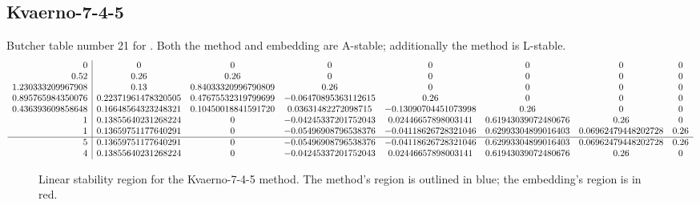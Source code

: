 \documentclass[letterpaper,10pt,english]{sphinxmanual}
\begin{document}
\subsection{Kvaerno-7-4-5}
\label{Butcher:kvaerno-7-4-5}\label{Butcher:butcher-kvaerno-7-4-5}
Butcher table number 21
for {\hyperref[c_interface/User_callable:c.ARKodeSetIRKTableNum]{\emph{}}}.  Both the
method and embedding are A-stable; additionally the method is
L-stable.
\begin{gather}
\begin{split}\begin{array}{r|ccccccc}
  0 & 0 & 0 & 0 & 0 & 0 & 0 & 0 \\
  0.52 & 0.26 & 0.26 & 0 & 0 & 0 & 0 & 0 \\
  1.230333209967908 & 0.13 & 0.84033320996790809 & 0.26 & 0 & 0 & 0 & 0 \\
  0.895765984350076 & 0.22371961478320505 & 0.47675532319799699 & -0.06470895363112615 & 0.26 & 0 & 0 & 0 \\
  0.436393609858648 & 0.16648564323248321 & 0.10450018841591720 & 0.03631482272098715 & -0.13090704451073998 & 0.26 & 0 & 0 \\
  1 & 0.13855640231268224 & 0 & -0.04245337201752043 & 0.02446657898003141 & 0.61943039072480676 & 0.26 & 0 \\
  1 & 0.13659751177640291 & 0 & -0.05496908796538376 & -0.04118626728321046 & 0.62993304899016403 & 0.06962479448202728 & 0.26 \\
  \hline
  5 & 0.13659751177640291 & 0 & -0.05496908796538376 & -0.04118626728321046 & 0.62993304899016403 & 0.06962479448202728 & 0.26 \\
  4 & 0.13855640231268224 & 0 & -0.04245337201752043 & 0.02446657898003141 & 0.61943039072480676 & 0.26 & 0
\end{array}\end{split}\notag
\end{gather}\begin{figure}[htbp]
\centering
\capstart

\caption{Linear stability region for the Kvaerno-7-4-5 method.  The method's
region is outlined in blue; the embedding's region is in red.}\end{figure}
\end{document}
